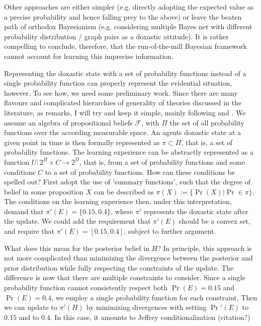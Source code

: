 \documentclass[11pt, a4paper]{scrartcl}
\begin{document}
Other approaches are either simpler (e.g. directly adopting the expected value as a precise probability and hence falling prey to the above) or leave the beaten path of orthodox Bayesianism (e.g. considering multiple Bayes net with different probability distribution / graph pairs as a doxastic attitude). It is rather compelling to conclude, therefore, that the run-of-the-mill Bayesian framework cannot account for learning this imprecise information. 

Representing the doxastic state with a set of probability functions instead of a single probability function can properly represent the evidential situation, however. To see how, we need some preliminary work. Since there are many flavours and complicated hierarchies of generality of theories discussed in the literature, as \citet{Norton2011-NORCTB} remarks, I will try and keep it simple, mainly following \citet{sep-imprecise-probabilities} and \citet{Grove:1998:USP:2074094.2074115}. We assume an algebra of propositional beliefs $\mathcal{F}$, with $\Pi$ the set of all probability functions over the according measurable space. An agents doxastic state at a given point in time is then formally represented as $\pi \subset \Pi$, that is, a set of probability functions. The learning experience can be abstractly represented as a function $U: 2^{\Pi} \times C \rightarrow 2^{\Pi}$, that is, from a set of probability functions and some conditions $C$ to a set of probability functions. How can these conditions be spelled out? First adopt the use of `summary functions', such that the degree of belief in some proposition $X$ can be described as ${\pi(X) := \{ \Pr(X) \vert \Pr \in \pi\}}$. The conditions on the learning experience then, under this interpretation, demand that $\pi'(E) = \{0.15, 0.4\}$, where $\pi'$ represents the doxastic state after the update. We could add the requirement that $\pi'(E)$ should be a convex set, and require that $\pi'(E)= [0.15,0.4]$, subject to further argument.

What does this mean for the posterior belief in $H$? In principle, this approach is not more complicated than minimizing the divergence between the posterior and prior distribution while fully respecting the constraints of the update. The difference is now that there are multiple constraints to consider. Since a single probability function cannot consistently respect both $\Pr(E) = 0.15$ and $\Pr(E) = 0.4$, we employ a single probability function for each constraint. Then we can update to $\pi'(H)$ by minimizing divergences with setting $\Pr'(E)$ to $0.15$ and to $0.4$. In this case, it amounts to Jeffrey conditionalization (citation?)
\end{document}
